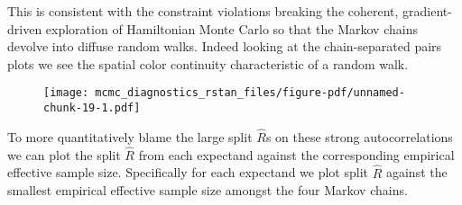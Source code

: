\documentclass[
  letterpaper,
  DIV=11,
  numbers=noendperiod]{scrartcl}
\newenvironment{Shaded}{\begin{snugshade}}{\end{snugshade}}
\newcommand{\AttributeTok}[1]{\textcolor[rgb]{0.40,0.45,0.13}{#1}}
\newcommand{\DecValTok}[1]{\textcolor[rgb]{0.68,0.00,0.00}{#1}}
\newcommand{\FloatTok}[1]{\textcolor[rgb]{0.68,0.00,0.00}{#1}}
\newcommand{\FunctionTok}[1]{\textcolor[rgb]{0.28,0.35,0.67}{#1}}
\newcommand{\NormalTok}[1]{\textcolor[rgb]{0.00,0.23,0.31}{#1}}
\newcommand{\OtherTok}[1]{\textcolor[rgb]{0.00,0.23,0.31}{#1}}
\newcommand{\SpecialCharTok}[1]{\textcolor[rgb]{0.37,0.37,0.37}{#1}}
\newcommand{\StringTok}[1]{\textcolor[rgb]{0.13,0.47,0.30}{#1}}
\begin{document}
This is consistent with the constraint violations breaking the coherent,
gradient-driven exploration of Hamiltonian Monte Carlo so that the
Markov chains devolve into diffuse random walks. Indeed looking at the
chain-separated pairs plots we see the spatial color continuity
characteristic of a random walk.

\begin{Shaded}
\end{Shaded}

\begin{figure}[H]

{\centering \texttt{[image: mcmc\_diagnostics\_rstan\_files/figure-pdf/unnamed-chunk-19-1.pdf]}

}

\end{figure}

To more quantitatively blame the large split \(\hat{R}\)s on these
strong autocorrelations we can plot the split \(\hat{R}\) from each
expectand against the corresponding empirical effective sample size.
Specifically for each expectand we plot split \(\hat{R}\) against the
smallest empirical effective sample size amongst the four Markov chains.

\begin{Shaded}
\end{Shaded}
\end{document}

